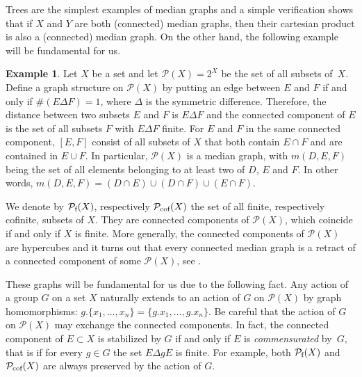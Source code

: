 \documentclass[a4paper]{article}
\theoremstyle{definition}
\newtheorem{exmp}[lem]{Example}
\newcommand*{\powerset}[1]{\mathcal P(#1)}
\newcommand*{\powersetf}[1]{\mathcal P_{\textnormal{f}}(#1)}
\newcommand*{\powersetcof}[1]{\mathcal P_{\textnormal{cof}}(#1)}
\begin{document}
Trees are the simplest examples of median graphs and a simple verification shows that if $X$ and $Y$ are both (connected) median graphs, then their cartesian product is also a (connected) median graph.
On the other hand, the following example will be fundamental for us.
%
%
\begin{exmp}\label{Ex:MainMedian}
Let $X$ be a set and let  $\powerset{X}=2^X$ be the set of all subsets of~$X$.
Define a graph structure on $\powerset{X}$ by putting an edge between $E$ and $F$ if and only if $\#(E\Delta F)=1$, where $\Delta$ is the symmetric difference.
Therefore, the distance between two subsets $E$ and $F$ is $E\Delta F$ and
the connected component of $E$ is the set of all subsets $F$ with $E\Delta F$ finite.
For $E$ and $F$ in the same connected component, $[E,F]$ consist of all subsets of $X$ that both contain $E\cap F$ and are contained in $E\cup F$.
In particular, $\powerset{X}$ is a median graph, with $m(D,E,F)$ being the set of all elements belonging to at least two of $D$, $E$ and $F$. In other words, $m(D,E,F)=(D\cap E)\cup(D\cap F)\cup(E\cap F)$.
\end{exmp}
%
%
We denote by $\powersetf{X}$, respectively $\powersetcof{X}$ the set of all finite, respectively cofinite, subsets of $X$.
They are connected components of $\powerset{X}$, which coincide if and only if $X$ is finite.
More generally, the connected components of $\powerset{X}$ are hypercubes and it turns out that every connected median graph is a retract of a connected component of some $\powerset{X}$, see \cite{Bandelt1984}.

These graphs will be fundamental for us due to the following fact.
Any action of a group $G$ on a set $X$ naturally extends to an action of $G$ on $\powerset{X}$ by graph homomorphisms: $g.\{x_1,\dots,x_n\}=\{g.x_1,\dots,g.x_n\}$.
Be careful that the action of $G$ on $\powerset{X}$ may exchange the connected components.
In fact, the connected component of $E\subset X$ is stabilized by $G$ if and only if $E$ is \emph{commensurated} by~$G$, that is if for every $g\in G$ the set $E\Delta gE$ is finite.
For example, both $\powersetf{X}$ and $\powersetcof{X}$ are always preserved by the action of $G$.
\end{document}

